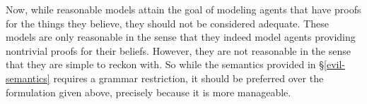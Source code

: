 Now, while reasonable models attain the goal of modeling agents that have
proofs for the things they believe, they should not be considered adequate. These models are only reasonable in the
sense that they indeed model agents providing nontrivial proofs for their beliefs.
However, they are not reasonable in the sense that they are simple
to reckon with.   So while the semantics provided in
\S\ref{evil-semantics} requires a grammar restriction, it should be
preferred over the formulation given above,
precisely because it is more manageable.
